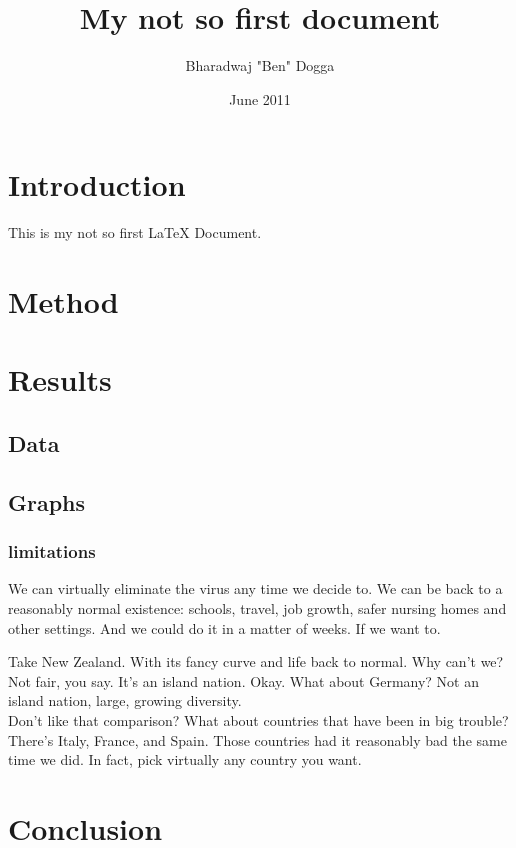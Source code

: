 \documentclass{article}
\title{My not so first document}
\author{Bharadwaj "Ben" Dogga}
\date{June 2011}
\begin{document}
\maketitle

\section{Introduction}
This is my not so first LaTeX Document.

\section{Method}

\section{Results}
\subsection{Data}
\subsection{Graphs}
\subsubsection{limitations}

We can virtually eliminate the virus any time we decide to. We can be back to a reasonably normal existence: schools, travel, job growth, safer nursing homes and other settings. And we could do it in a matter of weeks. If we want to.

Take New Zealand. With its fancy curve and life back to normal. Why can’t we? Not fair, you say. It’s an island nation. Okay. What about Germany? Not an island nation, large, growing diversity. \\Don’t like that comparison? What about countries that have been in big trouble? There’s Italy, France, and Spain. Those countries had it reasonably bad the same time we did. In fact, pick virtually any country you want.

\section{Conclusion}
\end{document}
